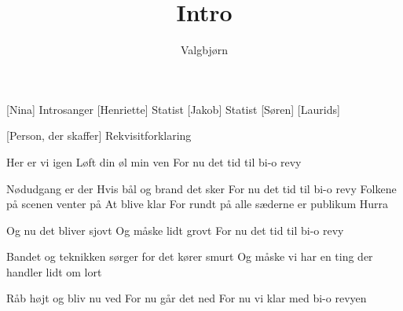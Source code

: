 \documentclass[a4paper,11pt]{article}
\title{Intro}
\author{Valgbjørn}
\begin{document}
\maketitle

\begin{roles}
    [Nina] Introsanger
    [Henriette] Statist
    [Jakob] Statist
    [Søren] 
    [Laurids]
\end{roles}

\begin{props}
    [Person, der skaffer] Rekvisitforklaring
\end{props}

\begin{song}
  Her er vi igen
Løft din øl min ven
For nu det tid til bi-o revy

  Nødudgang er der
Hvis bål og brand det sker
For nu det tid til bi-o revy
Folkene på scenen venter på
At blive klar
For rundt på alle sæderne er publikum Hurra

  Og nu det bliver sjovt
Og måske lidt grovt
For nu det tid til bi-o revy

  Bandet og teknikken sørger for
det kører smurt
Og måske vi har en ting der handler lidt om lort

  Råb højt og bliv nu ved
For nu går det ned
For nu vi klar med bi-o revyen


\end{song}
\end{document}
